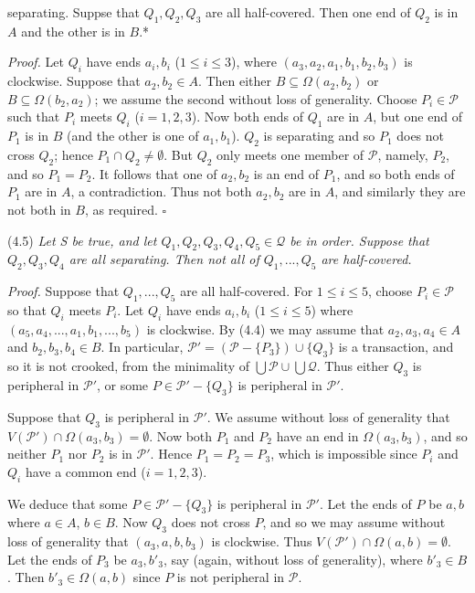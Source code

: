 \noindent separating. Suppse that $Q_1, Q_2, Q_3$ are all half-covered. Then one end of $Q_2$ is in $A$ and the other is in $B$.*

\textit{Proof.} Let $Q_i$ have ends $a_i, b_i$ ($1 \le i \le 3$), where $(a_3, a_2, a_1, b_1, b_2, b_3)$ is clockwise. Suppose that $a_2, b_2 \in A$. Then either $B \subseteq \Omega(a_2, b_2)$ or $B \subseteq \Omega(b_2, a_2)$; we assume the second without loss of generality. Choose $P_i \in \mathscr{P}$ such that $P_i$ meets $Q_i$ ($i = 1, 2, 3$). Now both ends of $Q_1$ are in $A$, but one end of $P_1$ is in $B$ (and the other is one of $a_1, b_1$). $Q_2$ is separating and so $P_1$ does not cross $Q_2$; hence $P_1 \cap Q_2 \ne \emptyset$. But $Q_2$ only meets one member of $\mathscr{P}$, namely, $P_2$, and so $P_1 = P_2$. It follows that one of $a_2, b_2$ is an end of $P_1$, and so both ends of $P_1$ are in $A$, a contradiction. Thus not both $a_2, b_2$ are in $A$, and similarly they are not both in $B$, as required. $\square$

\stmt
(4.5) \textit{Let S be true, and let $Q_1, Q_2, Q_3, Q_4, Q_5 \in \mathscr{Q}$ be in order. Suppose that $Q_2, Q_3, Q_4$ are all separating. Then not all of $Q_1, ..., Q_5$ are half-covered.}

\textit{Proof.} Suppose that $Q_1, ..., Q_5$ are all half-covered. For $1 \le i \le 5$, choose $P_i \in \mathscr{P}$ so that $Q_i$ meets $P_i$. Let $Q_i$ have ends $a_i, b_i$ ($1 \le i \le 5$) where $(a_5, a_4, ..., a_1, b_1, ..., b_5)$ is clockwise. By (4.4) we may assume that $a_2, a_3, a_4 \in A$ and $b_2, b_3, b_4 \in B$. In particular, $\mathscr{P}' = (\mathscr{P} - \{P_3\}) \cup \{Q_3\}$ is a transaction, and so it is not crooked, from the minimality of $\bigcup \mathscr{P} \cup \bigcup \mathscr{Q}$. Thus either $Q_3$ is peripheral in $\mathscr{P}'$, or some $P \in \mathscr{P}' - \{Q_3\}$ is peripheral in $\mathscr{P}'$.

Suppose that $Q_3$ is peripheral in $\mathscr{P}'$. We assume without loss of generality that $V(\mathscr{P}') \cap \Omega(a_3, b_3) = \emptyset$. Now both $P_1$ and $P_2$ have an end in $\Omega(a_3, b_3)$, and so neither $P_1$ nor $P_2$ is in $\mathscr{P}'$. Hence $P_1 = P_2 = P_3$, which is impossible since $P_i$ and $Q_i$ have a common end ($i = 1, 2, 3$).

We deduce that some $P \in \mathscr{P}' - \{Q_3\}$ is peripheral in $\mathscr{P}'$. Let the ends of $P$ be $a, b$ where $a \in A$, $b \in B$. Now $Q_3$ does not cross $P$, and so we may assume without loss of generality that $(a_3, a, b, b_3)$ is clockwise. Thus $V(\mathscr{P}') \cap \Omega(a, b) = \emptyset$. Let the ends of $P_3$ be $a_3, b'_3$, say (again, without loss of generality), where $b'_3 \in B$. Then $b'_3 \in \Omega(a, b)$ since $P$ is not peripheral in $\mathscr{P}$.

